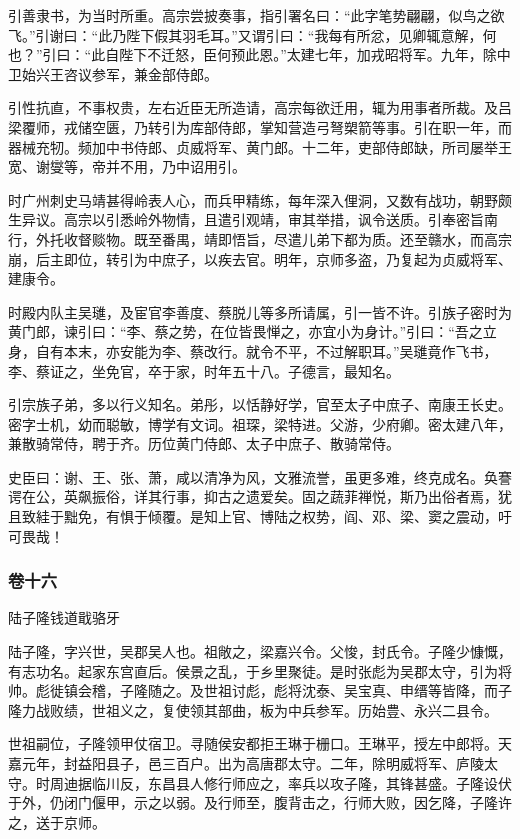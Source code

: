 \documentclass[]{article}
\begin{document}
引善隶书，为当时所重。高宗尝披奏事，指引署名曰：``此字笔势翩翩，似鸟之欲飞。''引谢曰：``此乃陛下假其羽毛耳。''又谓引曰：``我每有所忿，见卿辄意解，何也？''引曰：``此自陛下不迁怒，臣何预此恩。''太建七年，加戎昭将军。九年，除中卫始兴王咨议参军，兼金部侍郎。

引性抗直，不事权贵，左右近臣无所造请，高宗每欲迁用，辄为用事者所裁。及吕梁覆师，戎储空匮，乃转引为库部侍郎，掌知营造弓弩槊箭等事。引在职一年，而器械充牣。频加中书侍郎、贞威将军、黄门郎。十二年，吏部侍郎缺，所司屡举王宽、谢燮等，帝并不用，乃中诏用引。

时广州刺史马靖甚得岭表人心，而兵甲精练，每年深入俚洞，又数有战功，朝野颇生异议。高宗以引悉岭外物情，且遣引观靖，审其举措，讽令送质。引奉密旨南行，外托收督赕物。既至番禺，靖即悟旨，尽遣儿弟下都为质。还至赣水，而高宗崩，后主即位，转引为中庶子，以疾去官。明年，京师多盗，乃复起为贞威将军、建康令。

时殿内队主吴璡，及宦官李善度、蔡脱儿等多所请属，引一皆不许。引族子密时为黄门郎，谏引曰：``李、蔡之势，在位皆畏惮之，亦宜小为身计。''引曰：``吾之立身，自有本末，亦安能为李、蔡改行。就令不平，不过解职耳。''吴璡竟作飞书，李、蔡证之，坐免官，卒于家，时年五十八。子德言，最知名。

引宗族子弟，多以行义知名。弟彤，以恬静好学，官至太子中庶子、南康王长史。密字士机，幼而聪敏，博学有文词。祖琛，梁特进。父游，少府卿。密太建八年，兼散骑常侍，聘于齐。历位黄门侍郎、太子中庶子、散骑常侍。

史臣曰：谢、王、张、萧，咸以清净为风，文雅流誉，虽更多难，终克成名。奂謇谔在公，英飙振俗，详其行事，抑古之遗爱矣。固之蔬菲禅悦，斯乃出俗者焉，犹且致絓于黜免，有惧于倾覆。是知上官、博陆之权势，阎、邓、梁、窦之震动，吁可畏哉！

\hypertarget{header-n4685}{%
\subsubsection{卷十六}\label{header-n4685}}

陆子隆钱道戢骆牙

陆子隆，字兴世，吴郡吴人也。祖敞之，梁嘉兴令。父悛，封氏令。子隆少慷慨，有志功名。起家东宫直后。侯景之乱，于乡里聚徒。是时张彪为吴郡太守，引为将帅。彪徙镇会稽，子隆随之。及世祖讨彪，彪将沈泰、吴宝真、申缙等皆降，而子隆力战败绩，世祖义之，复使领其部曲，板为中兵参军。历始豊、永兴二县令。

世祖嗣位，子隆领甲仗宿卫。寻随侯安都拒王琳于栅口。王琳平，授左中郎将。天嘉元年，封益阳县子，邑三百户。出为高唐郡太守。二年，除明威将军、庐陵太守。时周迪据临川反，东昌县人修行师应之，率兵以攻子隆，其锋甚盛。子隆设伏于外，仍闭门偃甲，示之以弱。及行师至，腹背击之，行师大败，因乞降，子隆许之，送于京师。
\end{document}
